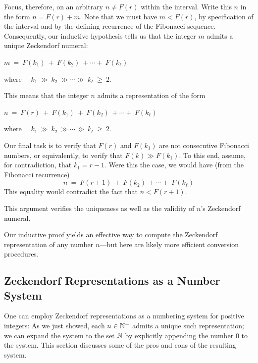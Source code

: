 \smallskip

Focus, therefore, on an arbitrary $n \neq F(r)$ within the interval.  Write this $n$ in the form $n = F(r) + m$.  Note that we must have $m < F(r)$, by specification of the interval and by the defining recurrence of the Fibonacci sequence.  Consequently, our inductive hypothesis tells us that the integer $m$ admits a unique Zeckendorf numeral:

\smallskip

\hspace*{.25in} $m \ = \ F(k_1) \ + \ F(k_2) \ + \cdots + \ F(k_\ell)$

\smallskip

\noindent
where \ \ $k_1 \ \gg \ k_2 \ \gg \cdots \gg \ k_\ell \ \geq \ 2$.

\smallskip

\noindent
This means that the integer $n$ admits a representation of the form

\smallskip

\hspace*{.25in} $n \ = \ F(r) \ + \ F(k_1) \ + \ F(k_2) \ + \cdots + \ F(k_\ell)$

\smallskip

\noindent
where \ \ $k_1 \ \gg \ k_2 \ \gg \cdots \gg \ k_\ell \ \geq \ 2$.

\smallskip 

Our final task is to verify that $F(r)$ and $F(k_1)$ are not consecutive Fibonacci numbers, or equivalently, to verify that $F(k) \gg F(k_1)$.  To this end, assume, for contradiction, that $k_1=r-1$.  Were this the case, we would have (from the Fibonacci recurrence)
\[ n \ = \ F(r+1) \ + \ F(k_2) \ + \cdots + \ F(k_\ell) \]
This equality would contradict the fact that $n < F(r+1)$.

\smallskip

This argument verifies the uniqueness as well as the validity of $n$'s Zeckendorf numeral.

\medskip

Our inductive proof yields an effective way to compute the Zeckendorf representation of any number $n$---but here are likely more efficient conversion procedures.

\subsection{Zeckendorf Representations as a Number System}
\label{sec:Zeck-rep-number-system}

One can employ Zeckendorf representations as a numbering system for positive integers:  As we just showed, each $n \in \mathbb{N}^+$ admits a unique such representation; we can expand the system to the set $\mathbb{N}$ by explicitly appending the number $0$ to the system.  This section discusses some of the pros and cons of the resulting system.

